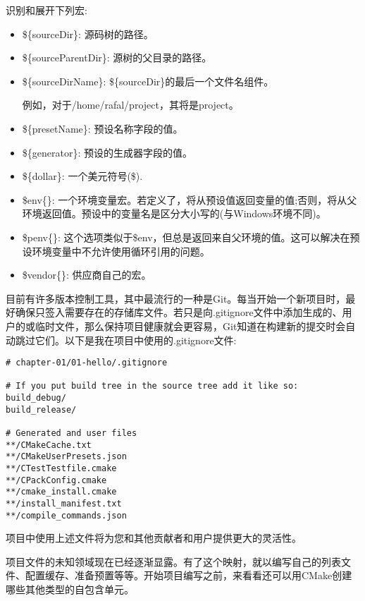 识别和展开下列宏:

\begin{itemize}
\item 
\$\{sourceDir\}: 源码树的路径。

\item 
\$\{sourceParentDir\}: 源树的父目录的路径。

\item 
\$\{sourceDirName\}: \$\{sourceDir\}的最后一个文件名组件。

例如，对于/home/rafal/project，其将是project。

\item 
\$\{presetName\}: 预设名称字段的值。

\item 
\$\{generator\}: 预设的生成器字段的值。

\item 
\$\{dollar\}: 一个美元符号(\$).

\item 
\$env\{<variable-name>\}: 一个环境变量宏。若定义了，将从预设值返回变量的值;否则，将从父环境返回值。预设中的变量名是区分大小写的(与Windows环境不同)。

\item 
\$penv\{<variable-name>\}: 这个选项类似于\$env，但总是返回来自父环境的值。这可以解决在预设环境变量中不允许使用循环引用的问题。

\item 
\$vendor\{<macro-name>\}: 供应商自己的宏。
\end{itemize}



目前有许多版本控制工具，其中最流行的一种是Git。每当开始一个新项目时，最好确保只签入需要存在的存储库文件。若只是向.gitignore文件中添加生成的、用户的或临时文件，那么保持项目健康就会更容易，Git知道在构建新的提交时会自动跳过它们。以下是我在项目中使用的.gitignore文件:

\begin{lstlisting}[style=styleCMake]	
# chapter-01/01-hello/.gitignore
	
# If you put build tree in the source tree add it like so:
build_debug/
build_release/

# Generated and user files
**/CMakeCache.txt
**/CMakeUserPresets.json
**/CTestTestfile.cmake
**/CPackConfig.cmake
**/cmake_install.cmake
**/install_manifest.txt
**/compile_commands.json
\end{lstlisting}

项目中使用上述文件将为您和其他贡献者和用户提供更大的灵活性。

项目文件的未知领域现在已经逐渐显露。有了这个映射，就以编写自己的列表文件、配置缓存、准备预置等等。开始项目编写之前，来看看还可以用CMake创建哪些其他类型的自包含单元。










